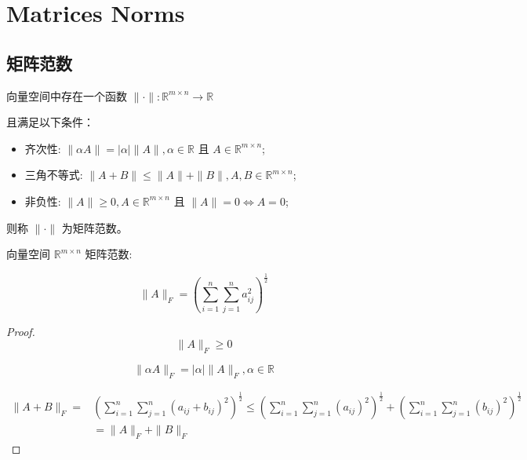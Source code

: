 \chapter{Matrices Norms}

\section{矩阵范数}

\begin{definition}
    向量空间中存在一个函数 $ \|\cdot\|: \mathbb{R}^{m \times n} \rightarrow \mathbb{R} $

    且满足以下条件：

    \begin{itemize}
        \item 齐次性: $ \|\alpha A\|=|\alpha|\|A\|, \alpha \in \mathbb{R} $ 且 $ A \in \mathbb{R}^{m \times n} $;
        \item 三角不等式: $ \|A+B\| \leq\|A\|+\|B\|, A, B \in \mathbb{R}^{m \times n} $;
        \item 非负性: $ \|A\| \geq 0, A \in \mathbb{R}^{m \times n} $ 且 $ \|A\|=0 \Leftrightarrow A=0 $;
    \end{itemize}

则称 $ \|\cdot\| $ 为矩阵范数。 
\end{definition}

向量空间 $ \mathbb{R}^{m \times n} $ 矩阵范数:

\begin{example}
    \begin{equation} \|A\|_{F}=\left(\sum_{i=1}^{n} \sum_{j=1}^{n} a_{i j}^{2}\right)^{\frac{1}{2}} \end{equation}
\end{example}

\begin{proof}
    \begin{equation} \|A\|_{F} \geq 0 \end{equation}

    \begin{equation} \|\alpha A\|_{F}=|\alpha|\|A\|_{F}, \alpha \in \mathbb{R} \end{equation}

    \begin{equation} \begin{aligned}\|A+B\|_{F}=&\left(\sum_{i=1}^{n} \sum_{j=1}^{n}\left(a_{i j}+b_{i j}\right)^{2}\right)^{\frac{1}{2}} \leq\left(\sum_{i=1}^{n} \sum_{j=1}^{n}\left(a_{i j}\right)^{2}\right)^{\frac{1}{2}}+\left(\sum_{i=1}^{n} \sum_{j=1}^{n}\left(b_{i j}\right)^{2}\right)^{\frac{1}{2}} \\ &=\|A\|_{F}+\|B\|_{F} \end{aligned} \end{equation}
\end{proof}

